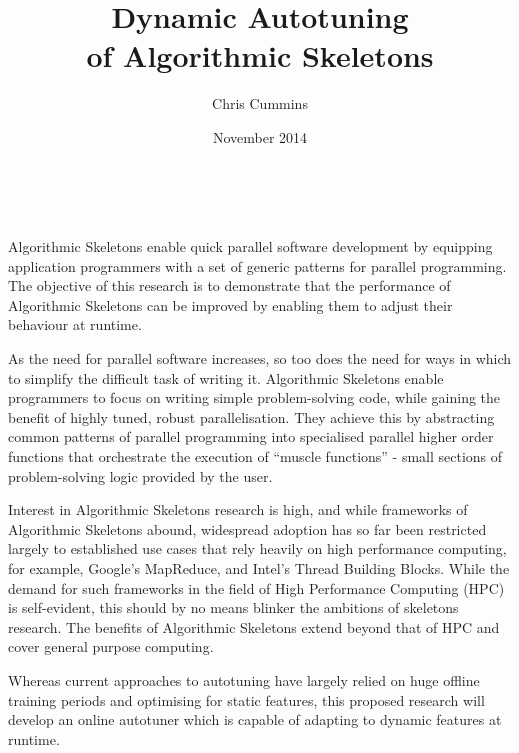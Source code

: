 \title{Dynamic Autotuning\\of Algorithmic Skeletons}
\author{Chris Cummins}
\date{November 2014}





\begin{center}
  \huge
  \textbf{\@title}
  \vspace{.5em}

  \normalsize
  \@author\\
  \@date
  \vspace{.5em}
\end{center}

Algorithmic Skeletons enable quick parallel software development by
equipping application programmers with a set of generic patterns for
parallel programming. The objective of this research is to demonstrate
that the performance of Algorithmic Skeletons can be improved by
enabling them to adjust their behaviour at runtime.

As the need for parallel software increases, so too does the need for
ways in which to simplify the difficult task of writing
it. Algorithmic Skeletons enable programmers to focus on writing
simple problem-solving code, while gaining the benefit of highly
tuned, robust parallelisation. They achieve this by abstracting common
patterns of parallel programming into specialised parallel higher
order functions that orchestrate the execution of ``muscle functions''
- small sections of problem-solving logic provided by the user.

Interest in Algorithmic Skeletons research is high, and while
frameworks of Algorithmic Skeletons abound, widespread adoption has so
far been restricted largely to established use cases that rely heavily
on high performance computing, for example, Google's MapReduce, and
Intel's Thread Building Blocks. While the demand for such frameworks
in the field of High Performance Computing (HPC) is self-evident, this
should by no means blinker the ambitions of skeletons research. The
benefits of Algorithmic Skeletons extend beyond that of HPC and cover
general purpose computing.



Whereas current approaches to autotuning have largely relied on huge
offline training periods and optimising for static features, this
proposed research will develop an online autotuner which is capable of
adapting to dynamic features at runtime.

